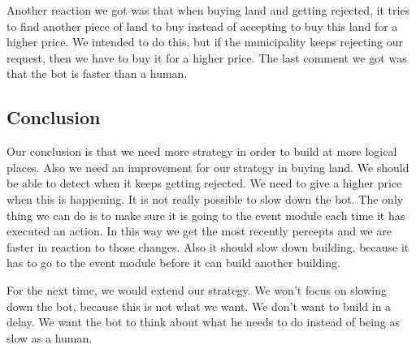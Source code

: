 Another reaction we got was that when buying land and getting rejected, it tries to find another piece of land to buy instead of accepting to buy this land for a higher price. We intended to do this, but if the municipality keeps rejecting our request, then we have to buy it for a higher price. The last comment we got was that the bot is faster than a human. 

\subsection{Conclusion}
Our conclusion is that we need more strategy in order to build at more logical places. Also we need an improvement for our strategy in buying land. We should be able to detect when it keeps getting rejected. We need to give a higher price when this is happening. It is not really possible to slow down the bot. The only thing we can do is to make sure it is going to the event module each time it has executed an action. In this way we get the most recently percepts and we are faster in reaction to those changes. Also it should slow down building, because it has to go to the event module before it can build another building. 

For the next time, we would extend our strategy. We won't focus on slowing down the bot, because this is not what we want. We don't want to build in a delay. We want the bot to think about what he needs to do instead of being as slow as a human.